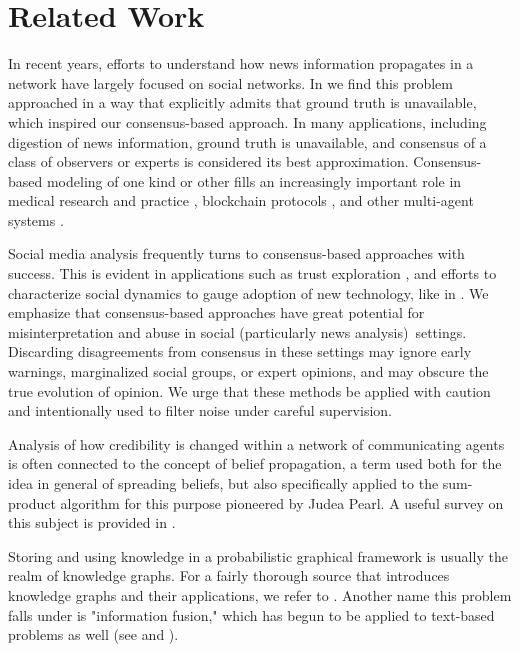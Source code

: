 \documentclass{amsart}
\theoremstyle{plain}
\numberwithin{equation}{section}
\begin{document}
\section{Related Work}

In recent years, efforts to understand how news information propagates in a
network have largely focused on social networks. In \cite%
{zafarani2015evaluation} we find this problem approached in a way that
explicitly admits that ground truth is unavailable, which inspired our
consensus-based approach. In many applications, including digestion of news
information, ground truth is unavailable, and consensus of a class of
observers or experts is considered its best approximation. Consensus-based
modeling of one kind or other fills an increasingly important role in
medical research and practice \cite{fink1984consensus}, blockchain protocols 
\cite{sankar2017survey}, and other multi-agent systems \cite{ren2005survey}.

Social media analysis frequently turns to consensus-based approaches with
success. This is evident in applications such as trust exploration \cite%
{heuer2018trust}, and efforts to characterize social dynamics to gauge
adoption of new technology, like in \cite{kohler2001density}. We emphasize
that consensus-based approaches have great potential for misinterpretation
and abuse in social (particularly news analysis)\ settings. Discarding
disagreements from consensus in these settings may ignore early warnings,
marginalized social groups, or expert opinions, and may obscure the true
evolution of opinion. We urge that these methods be applied with caution and
intentionally used to filter noise under careful supervision.

Analysis of how credibility is changed within a network of communicating
agents is often connected to the concept of belief propagation, a term used
both for the idea in general of spreading beliefs, but also specifically
applied to the sum-product algorithm for this purpose pioneered by Judea
Pearl. A useful survey on this subject is provided in \cite%
{yedidia2003understanding}.

Storing and using knowledge in a probabilistic graphical framework is
usually the realm of knowledge graphs. For a fairly thorough source that
introduces knowledge graphs and their applications, we refer to \cite%
{hogan2021knowledge}. Another name this problem falls under is "information
fusion," which has begun to be applied to text-based problems as well (see 
\cite{levchuk2015probabilistic} and \cite{radev2000common}).
\end{document}
